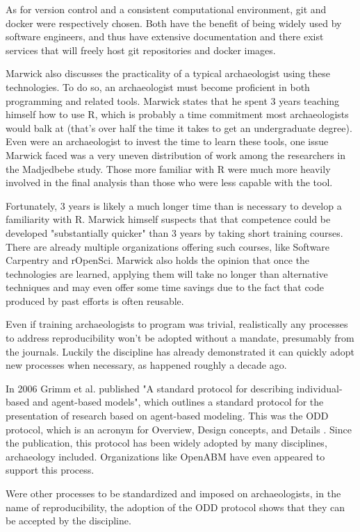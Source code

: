 \documentclass[12pt]{article}
\begin{document}
As for version control and a consistent computational environment, git and
docker were respectively chosen. Both have the benefit of being widely used by
software engineers, and thus have extensive documentation and there exist
services that will freely host git repositories and docker images.

Marwick also discusses the practicality of a typical archaeologist using these
technologies. To do so, an archaeologist must become proficient in both
programming and related tools. Marwick states that he spent 3 years teaching
himself how to use R, which is probably a time commitment most archaeologists
would balk at (that's over half the time it takes to get an undergraduate
degree). Even were an archaeologist to invest the time to learn these tools,
one issue Marwick faced was a very uneven distribution of work among the
researchers in the Madjedbebe study. Those more familiar with R were much more
heavily involved in the final analysis than those who were less capable with
the tool.

Fortunately, 3 years is likely a much longer time than is necessary to develop
a familiarity with R. Marwick himself suspects that that competence could be
developed "substantially quicker" than 3 years by taking short training
courses. There are already multiple organizations offering such courses, like
Software Carpentry and rOpenSci. Marwick also holds the opinion that once the
technologies are learned, applying them will take no longer than alternative
techniques and may even offer some time savings due to the fact that code
produced by past efforts is often reusable.

Even if training archaeologists to program was trivial, realistically any
processes to address reproducibility won't be adopted without a mandate,
presumably from the journals. Luckily the discipline has already demonstrated
it can quickly adopt new processes when necessary, as happened roughly a decade
ago.

In 2006 Grimm et al. published "A standard protocol for describing
individual-based and agent-based models", which outlines a standard protocol
for the presentation of research based on agent-based modeling. This was the
ODD protocol, which is an acronym for Overview, Design concepts, and Details
\cite{grimm06}.  Since the publication, this protocol has been widely adopted
by many disciplines, archaeology included. Organizations like OpenABM have even
appeared to support this process.

Were other processes to be standardized and imposed on archaeologists, in the
name of reproducibility, the adoption of the ODD protocol shows that they can
be accepted by the discipline.
\end{document}
